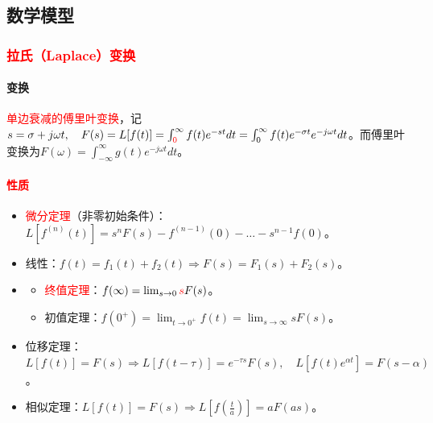 \documentclass[
12pt, %
a4paper, 
oneside, %
]{scrartcl}
\begin{document}
\subsection[数学模型]{数学模型}
\subsubsection[拉氏变换]{\textcolor{red}{拉氏（Laplace）变换}}
\paragraph{变换}
\textcolor{red}{单边衰减的傅里叶变换}，记$ s = \sigma + j \omega t, \quad F(s) = L[f(t)] = \int_{\textcolor{red}{0}}^{\infty} f(t) e^{-st} dt = \int_0^{\infty} f(t) e^{-\sigma t} e^{-j \omega t} dt $。而傅里叶变换为$ F(\omega) = \int_{-\infty}^{\infty} g(t) e^{-j \omega t} dt $。
\paragraph{\textcolor{red}{性质}}
\begin{itemize}
\item \textcolor{red}{微分定理}（非零初始条件）：$ L[f^{(n)}(t)] = s^n F(s) - f^{(n - 1)}(0) - \dots - s^{n - 1} f(0) $。
\item 线性：$ f(t) = f_1(t) + f_2(t) \Rightarrow F(s) = F_1(s) + F_2(s) $。
\item
\begin{itemize}
\item \textcolor{red}{终值定理}：$ f(\infty) = \lim_{s \to 0} \textcolor{red}{s} F(s) $。
\item 初值定理：$ f(0^+) = \lim_{t \to 0^+} f(t)  = \lim_{s \to \infty} sF(s) $。
\end{itemize}
\item 位移定理：$ L[f(t)] = F(s) \Rightarrow L[f(t - \tau)] = e^{-\tau s}F(s), \quad L[f(t)e^{\alpha t}] = F(s - \alpha) $。
\item 相似定理：$ L[f(t)] = F(s) \Rightarrow L[f(\frac{t}{a})] = a F(as) $。
\end{itemize}
\end{document}
